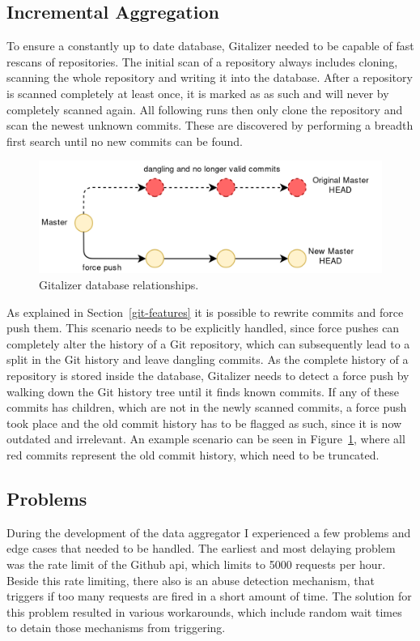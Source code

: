 \subsection{Incremental Aggregation}
To ensure a constantly up to date database, Gitalizer needed to be capable of fast rescans of repositories.
The initial scan of a repository always includes cloning, scanning the whole repository and writing it into the database.
After a repository is scanned completely at least once, it is marked as as such and will never by completely scanned again.
All following runs then only clone the repository and scan the newest unknown commits.
These are discovered by performing a breadth first search until no new commits can be found.

\begin{figure}[H]
\includegraphics[scale=0.3]{./graphs/git-history-rewrite}
\centering
\caption{Gitalizer database relationships.}\label{fig:gitalizer-relationship}
\end{figure}

As explained in Section~\ref{git-features} it is possible to rewrite commits and force push them.
This scenario needs to be explicitly handled, since force pushes can completely alter the history of a Git repository, which can subsequently lead to a split in the Git history and leave dangling commits.
As the complete history of a repository is stored inside the database, Gitalizer needs to detect a force push by walking down the Git history tree until it finds known commits.
If any of these commits has children, which are not in the newly scanned commits, a force push took place and the old commit history has to be flagged as such, since it is now outdated and irrelevant.
An example scenario can be seen in Figure~\ref{fig:gitalizer-relationship}, where all red commits represent the old commit history, which need to be truncated.


\subsection{Problems}
During the development of the data aggregator I experienced a few problems and edge cases that needed to be handled.
The earliest and most delaying problem was the rate limit of the Github \ac{api}, which limits to 5000 requests per hour.
Beside this rate limiting, there also is an abuse detection mechanism, that triggers if too many requests are fired in a short amount of time.
The solution for this problem resulted in various workarounds, which include random wait times to detain those mechanisms from triggering.

